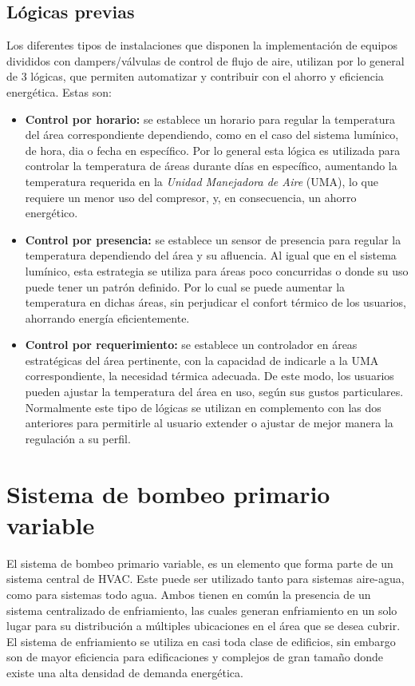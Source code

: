 \subsection{Lógicas previas}
Los diferentes tipos de instalaciones que disponen la
implementación de equipos divididos con dampers/válvulas de control de flujo de aire, utilizan por lo general de 3 lógicas, que permiten
automatizar y contribuir con el ahorro y eficiencia energética. Estas
son:
\begin{itemize}
    \item \textbf{Control por horario:}
se establece un horario para regular la temperatura del área correspondiente dependiendo, como en el caso del sistema lumínico, de hora, dia o fecha en específico. Por lo general esta lógica es utilizada para controlar la temperatura de áreas durante días en específico, aumentando la temperatura requerida en la \textit{Unidad Manejadora de Aire} (UMA), lo que requiere un menor uso del compresor, y, en consecuencia, un ahorro energético.

 \item \textbf{Control por presencia:}
se establece un sensor de presencia para regular la temperatura dependiendo del área y su afluencia. Al igual que en el sistema lumínico, esta estrategia se utiliza para áreas poco concurridas o donde su uso puede tener un patrón definido. Por lo cual se puede aumentar la temperatura en dichas áreas, sin perjudicar el confort térmico de los usuarios, ahorrando energía eficientemente.

 \item \textbf{Control por requerimiento:}
se establece un controlador en áreas estratégicas del área pertinente, con la capacidad de indicarle a la UMA correspondiente, la necesidad térmica adecuada. De este  modo, los usuarios pueden ajustar la temperatura del área en uso, según sus gustos particulares. Normalmente este tipo de lógicas se utilizan en complemento con las dos anteriores para permitirle al usuario extender o ajustar de mejor manera la regulación a su perfil.  
\end{itemize}
\section{Sistema de bombeo primario variable}
El sistema de bombeo primario variable, es un elemento que forma parte de un sistema central de HVAC. Este puede ser utilizado tanto para sistemas aire-agua, como para sistemas todo agua. Ambos tienen en común la presencia de un sistema centralizado de enfriamiento, las cuales generan enfriamiento en un solo lugar para su distribución a múltiples ubicaciones en el área que se desea cubrir. El sistema de enfriamiento se utiliza en casi toda clase de edificios, sin embargo son de mayor eficiencia para edificaciones y complejos de gran tamaño donde existe una alta densidad de demanda energética.

